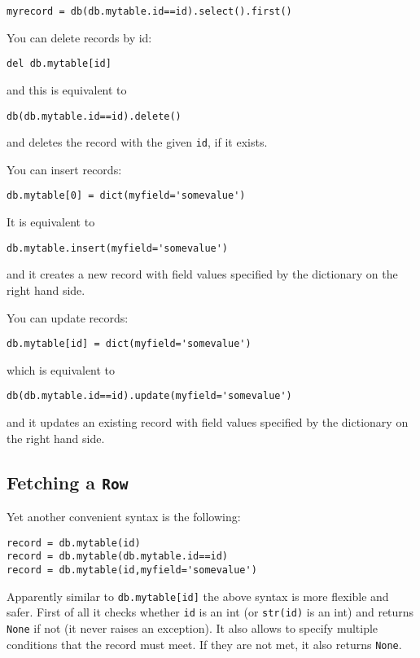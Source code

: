 \documentclass[justified,sixbynine,notoc]{tufte-book}
\def\ft{\small\tt}
\begin{document}
\begin{fullwidth}
\begin{lstlisting}
myrecord = db(db.mytable.id==id).select().first()
\end{lstlisting}

You can delete records by id:

\begin{lstlisting}
del db.mytable[id]
\end{lstlisting}
\noindent and this is equivalent to

\begin{lstlisting}
db(db.mytable.id==id).delete()
\end{lstlisting}
\noindent and deletes the record with the given {\ft id}, if it exists.

You can insert records:

\begin{lstlisting}
db.mytable[0] = dict(myfield='somevalue')
\end{lstlisting}

It is equivalent to

\begin{lstlisting}
db.mytable.insert(myfield='somevalue')
\end{lstlisting}
\noindent and it creates a new record with field values specified by the dictionary on the right hand side.

You can update records:

\begin{lstlisting}
db.mytable[id] = dict(myfield='somevalue')
\end{lstlisting}
\noindent which is equivalent to

\begin{lstlisting}
db(db.mytable.id==id).update(myfield='somevalue')
\end{lstlisting}
\noindent and it updates an existing record with field values specified by the dictionary on the right hand side.

\goodbreak\subsection{Fetching a {\ft Row}}

Yet another convenient syntax is the following:

\begin{lstlisting}
record = db.mytable(id)
record = db.mytable(db.mytable.id==id)
record = db.mytable(id,myfield='somevalue')
\end{lstlisting}

Apparently similar to {\ft db.mytable[id]} the above syntax is more flexible and safer. First of all it checks whether {\ft id} is an int (or {\ft str(id)} is an int) and returns {\ft None} if not (it never raises an exception). It also allows to specify multiple conditions that the record must meet. If they are not met, it also returns {\ft None}.


\end{fullwidth}
\end{document}
